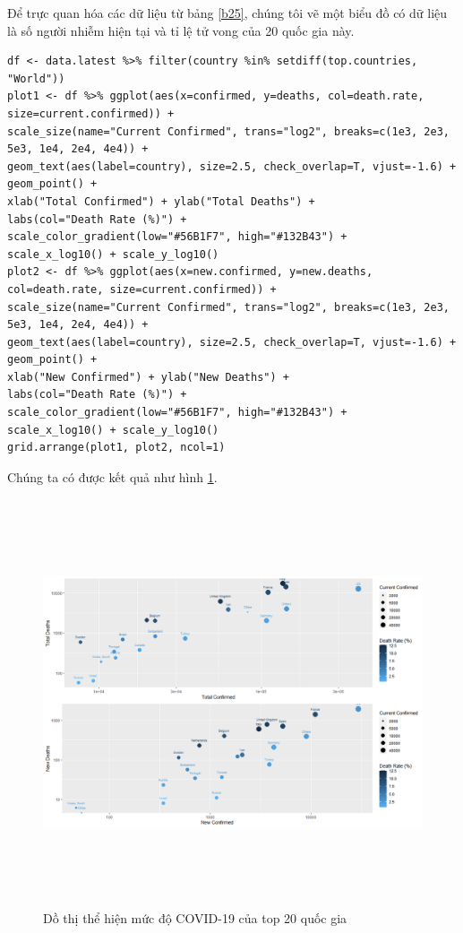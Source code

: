 \documentclass[12pt, a4paper,oneside]{book}
\theoremstyle{definition}
\begin{document}
Để trực quan hóa các dữ liệu từ bảng \ref{b25}, chúng tôi vẽ một biểu đồ có dữ liệu là số người nhiễm hiện tại và tỉ lệ tử vong của 20 quốc gia này.
\begin{lstlisting}
df <- data.latest %>% filter(country %in% setdiff(top.countries, "World"))
plot1 <- df %>% ggplot(aes(x=confirmed, y=deaths, col=death.rate, size=current.confirmed)) +
scale_size(name="Current Confirmed", trans="log2", breaks=c(1e3, 2e3, 5e3, 1e4, 2e4, 4e4)) +
geom_text(aes(label=country), size=2.5, check_overlap=T, vjust=-1.6) +
geom_point() +
xlab("Total Confirmed") + ylab("Total Deaths") +
labs(col="Death Rate (%)") +
scale_color_gradient(low="#56B1F7", high="#132B43") +
scale_x_log10() + scale_y_log10()
plot2 <- df %>% ggplot(aes(x=new.confirmed, y=new.deaths, col=death.rate, size=current.confirmed)) +
scale_size(name="Current Confirmed", trans="log2", breaks=c(1e3, 2e3, 5e3, 1e4, 2e4, 4e4)) +
geom_text(aes(label=country), size=2.5, check_overlap=T, vjust=-1.6) +
geom_point() +
xlab("New Confirmed") + ylab("New Deaths") +
labs(col="Death Rate (%)") +
scale_color_gradient(low="#56B1F7", high="#132B43") +
scale_x_log10() + scale_y_log10()
grid.arrange(plot1, plot2, ncol=1)
\end{lstlisting}
Chúng ta có được kết quả như hình \ref{h23}.
\begin{figure}[t]
	\centering
	\includegraphics[width=1\linewidth,height=12cm]{anh/Rplot02}  
	\vskip-4mm
	\caption{Dồ thị thể hiện mức độ COVID-19 của top 20 quốc gia}
	\label{h23}
\end{figure}
\end{document}
